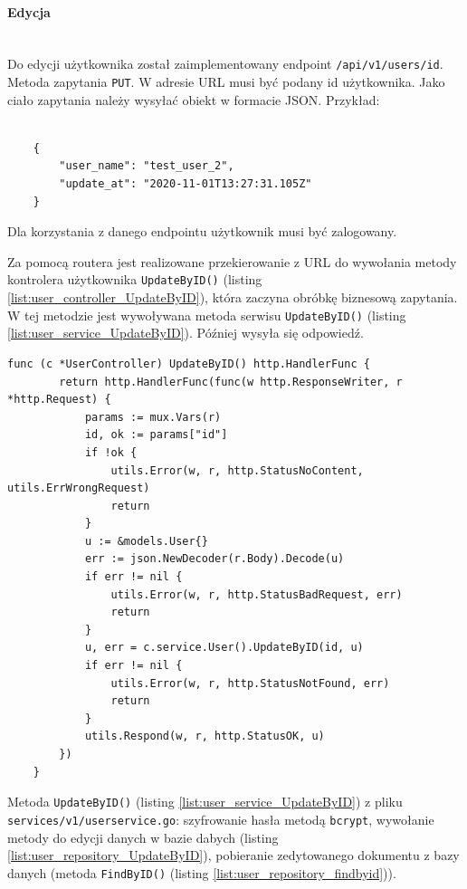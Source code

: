 % 
\paragraph{Edycja}\mbox{}\\
Do edycji użytkownika został zaimplementowany endpoint \texttt{/api/v1/users/{id}}.
Metoda zapytania \texttt{PUT}.
W adresie URL musi być podany id użytkownika.
Jako ciało zapytania należy wysyłać obiekt w formacie JSON. Przykład:
\begin{lstlisting}[basicstyle=\tiny\ttfamily]

    {
        "user_name": "test_user_2",
        "update_at": "2020-11-01T13:27:31.105Z"
    }
\end{lstlisting}
Dla korzystania z danego endpointu użytkownik musi być zalogowany.

Za pomocą routera jest realizowane przekierowanie z URL do wywołania metody kontrolera użytkownika \texttt{UpdateByID()} (listing \ref{list:user_controller_UpdateByID}), która zaczyna obróbkę biznesową zapytania.
W tej metodzie jest wywoływana metoda serwisu \texttt{UpdateByID()} (listing \ref{list:user_service_UpdateByID}). Później wysyła się odpowiedź.
\begin{lstlisting}[label=list:user_controller_UpdateByID,caption=Kontroler edycji użytkownika,basicstyle=\tiny\ttfamily]
    func (c *UserController) UpdateByID() http.HandlerFunc {
        return http.HandlerFunc(func(w http.ResponseWriter, r *http.Request) {
            params := mux.Vars(r)
            id, ok := params["id"]
            if !ok {
                utils.Error(w, r, http.StatusNoContent, utils.ErrWrongRequest)
                return
            }
            u := &models.User{}
            err := json.NewDecoder(r.Body).Decode(u)
            if err != nil {
                utils.Error(w, r, http.StatusBadRequest, err)
                return
            }
            u, err = c.service.User().UpdateByID(id, u)
            if err != nil {
                utils.Error(w, r, http.StatusNotFound, err)
                return
            }
            utils.Respond(w, r, http.StatusOK, u)
        })
    }
\end{lstlisting}
Metoda \texttt{UpdateByID()} (listing \ref{list:user_service_UpdateByID}) z pliku \texttt{services/v1/userservice.go}: szyfrowanie hasła metodą \texttt{bcrypt}, wywołanie metody do edycji danych w bazie dabych (listing \ref{list:user_repository_UpdateByID}), pobieranie zedytowanego dokumentu z bazy danych (metoda \texttt{FindByID()} (listing \ref{list:user_repository_findbyid})).
